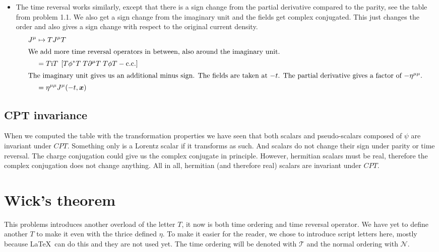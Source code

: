 \documentclass[11pt, english, fleqn, DIV=15, headinclude, BCOR=1cm]{scrartcl}
\begin{document}
\begin{itemize}
    \item
        The time reversal works similarly, except that there is a sign change
        from the partial derivative compared to the parity, see the table from
        problem 1.1. We also get a sign change from the
        imaginary unit and the fields get complex conjugated. This just changes
        the order and also gives a sign change with respect to the original
        current density.
        \begin{align*}
            J^\mu
            &\mapsto T J^\mu T \\
            \intertext{%
                We add more time reversal operators in between, also around the
                imaginary unit.
            }
            &= T \iup T \; \sbr{T \phi^* T \; T \partial^\mu T \; T \phi T
            - \cc} \\
            \intertext{%
                The imaginary unit gives us an additional minus sign. The
                fields are taken at $-t$. The partial derivative gives a factor
                of $-\eta^{\mu\mu}$.
            }
            &= \eta^{\mu\mu} J^\mu(-t, \vec x)
        \end{align*}
\end{itemize}

\subsection{CPT invariance}

When we computed the table with the transformation properties we have seen that
both scalars and pseudo-scalars composed of $\psi$ are invariant under $CPT$.
Something only is a Lorentz scalar if it transforms as such. And scalars do not
change their sign under parity or time reversal. The charge conjugation could
give us the complex conjugate in principle. However, hermitian scalars must be
real, therefore the complex conjugation does not change anything. All in all,
hermitian (and therefore real) scalars are invariant under $CPT$.

\section{Wick's theorem}
\label{homework:2}

\newcommand\timeorder{\mathscr T}
\newcommand\normorder{\mathscr N}

This problems introduces another overload of the letter $T$, it now is both
time ordering and time reversal operator. We have yet to define another $T$ to
make it even with the thrice defined $\eta$. To make it easier for the reader,
we chose to introduce script letters here, mostly because \LaTeX\ can do this
and they are not used yet. The time ordering will be denoted with $\timeorder$
and the normal ordering with $\normorder$.
\end{document}
